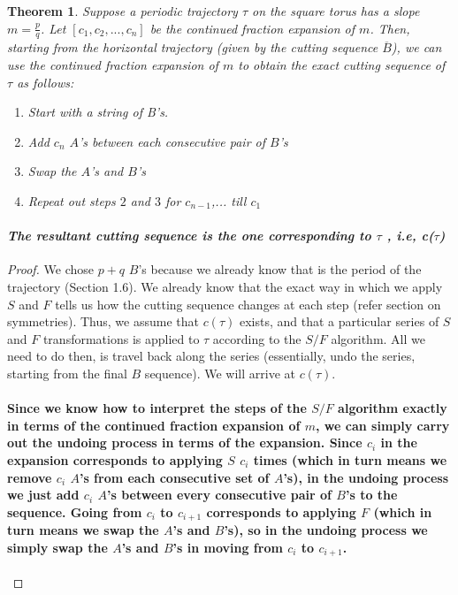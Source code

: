 \documentclass{report}
\newtheorem{theorem}{Theorem}[chapter]
\begin{document}
\begin{theorem}
{Suppose a periodic trajectory $\tau$ on the square torus has a slope $m=\frac{p}{q}$. Let $[c_1, c_2,..., c_n]$ be the continued fraction expansion of $m$. Then, starting from the horizontal trajectory (given by the cutting sequence $\overline{B}$), we can use the continued fraction expansion of $m$ to obtain the exact cutting sequence of $\tau$ as follows:

\begin{enumerate}
\item  { \textit{Start with a string of B’s.}}

\item  { \textit{Add $c_n$ $A$’s between each consecutive pair of $B$’s}}

\item  { \textit{Swap the $A$’s and $B$’s}}

\item  { \textit{Repeat out steps $2$ and $3$ for $c_{n-1}$,... till $c_1$}}
\end{enumerate}

\paragraph{\textit{The resultant cutting sequence is the one corresponding to $\tau$ , i.e, c($\tau$)}}}
\end{theorem}

\begin{proof}
{We chose $p+q$ $B$’s because we already know that is the period of the trajectory (Section 1.6). We already know that the exact way in which we apply $S$ and $F$ tells us how the cutting sequence changes at each step (refer section on symmetries). Thus, we assume that $c(\tau)$ exists, and that a particular series of $S$ and $F$ transformations is applied to $\tau$ according to the $S/F$ algorithm. All we need to do then, is travel back along the series (essentially, undo the series, starting from the final $B$ sequence). We will arrive at $c(\tau)$.

\paragraph{Since we know how to interpret the steps of the $S/F$ algorithm exactly in terms of the continued fraction expansion of $m$, we can simply carry out the undoing process in terms of the expansion. Since $c_i$ in the expansion corresponds to applying $S$ $c_i$ times (which in turn means we remove $c_i$ $A$’s from each consecutive set of $A$’s), in the undoing process we just add $c_i$ $A$’s between every consecutive pair of $B$’s to the sequence. Going from $c_i$ to $c_{i+1}$ corresponds to applying $F$ (which in turn means we swap the $A$’s and $B$’s), so in the undoing process we simply swap the $A$’s and $B$’s in moving from  $c_i$ to $c_{i+1}$.}}
\end{proof}
\end{document}
